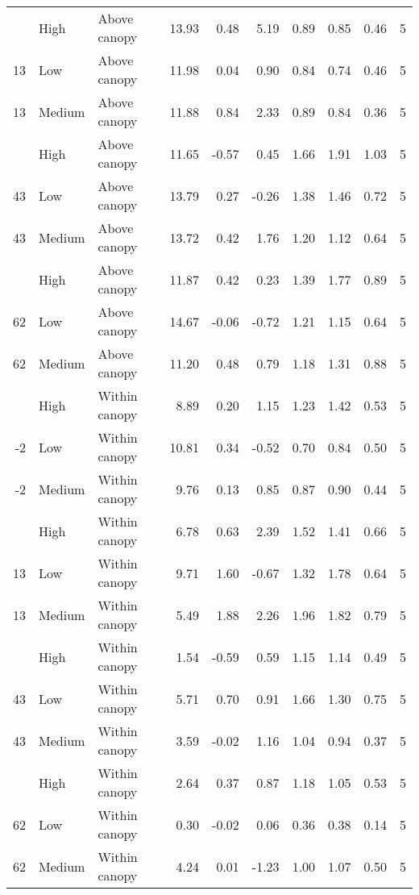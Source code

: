 \documentclass[10pt,]{article}
\begin{document}
\begin{longtable}{rllrrrrrrr}
\addlinespace
13 & High & Above canopy & 13.93 & 0.48 & 5.19 & 0.89 & 0.85 & 0.46 & 5\\
13 & Low & Above canopy & 11.98 & 0.04 & 0.90 & 0.84 & 0.74 & 0.46 & 5\\
13 & Medium & Above canopy & 11.88 & 0.84 & 2.33 & 0.89 & 0.84 & 0.36 & 5\\
\addlinespace
43 & High & Above canopy & 11.65 & -0.57 & 0.45 & 1.66 & 1.91 & 1.03 & 5\\
43 & Low & Above canopy & 13.79 & 0.27 & -0.26 & 1.38 & 1.46 & 0.72 & 5\\
43 & Medium & Above canopy & 13.72 & 0.42 & 1.76 & 1.20 & 1.12 & 0.64 & 5\\
\addlinespace
62 & High & Above canopy & 11.87 & 0.42 & 0.23 & 1.39 & 1.77 & 0.89 & 5\\
62 & Low & Above canopy & 14.67 & -0.06 & -0.72 & 1.21 & 1.15 & 0.64 & 5\\
62 & Medium & Above canopy & 11.20 & 0.48 & 0.79 & 1.18 & 1.31 & 0.88 & 5\\
\addlinespace
-2 & High & Within canopy & 8.89 & 0.20 & 1.15 & 1.23 & 1.42 & 0.53 & 5\\
-2 & Low & Within canopy & 10.81 & 0.34 & -0.52 & 0.70 & 0.84 & 0.50 & 5\\
-2 & Medium & Within canopy & 9.76 & 0.13 & 0.85 & 0.87 & 0.90 & 0.44 & 5\\
\addlinespace
13 & High & Within canopy & 6.78 & 0.63 & 2.39 & 1.52 & 1.41 & 0.66 & 5\\
13 & Low & Within canopy & 9.71 & 1.60 & -0.67 & 1.32 & 1.78 & 0.64 & 5\\
13 & Medium & Within canopy & 5.49 & 1.88 & 2.26 & 1.96 & 1.82 & 0.79 & 5\\
\addlinespace
43 & High & Within canopy & 1.54 & -0.59 & 0.59 & 1.15 & 1.14 & 0.49 & 5\\
43 & Low & Within canopy & 5.71 & 0.70 & 0.91 & 1.66 & 1.30 & 0.75 & 5\\
43 & Medium & Within canopy & 3.59 & -0.02 & 1.16 & 1.04 & 0.94 & 0.37 & 5\\
\addlinespace
62 & High & Within canopy & 2.64 & 0.37 & 0.87 & 1.18 & 1.05 & 0.53 & 5\\
62 & Low & Within canopy & 0.30 & -0.02 & 0.06 & 0.36 & 0.38 & 0.14 & 5\\
62 & Medium & Within canopy & 4.24 & 0.01 & -1.23 & 1.00 & 1.07 & 0.50 & 5\\*
\end{longtable}\endgroup{}
\end{document}
